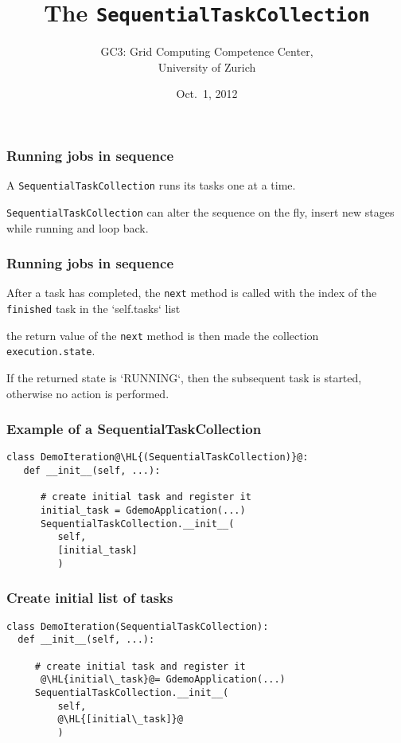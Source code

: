 \documentclass[english,serif,mathserif,xcolor=pdftex,dvipsnames,table]{beamer}
\title{%
  The \texttt{SequentialTaskCollection}
}
\author[Sergio Maffioletti]{%
  GC3: Grid Computing Competence Center, \\
  University of Zurich
}
\date{Oct.~1, 2012}
\begin{document}
\maketitle

\begin{frame}
  \frametitle{Running jobs in sequence}
  \begin{block}{}
    A \texttt{SequentialTaskCollection} runs its tasks one at a time.
  \end{block}
  \begin{block}{}
    \texttt{SequentialTaskCollection} can alter the sequence
    on the fly, insert new stages while running and loop
    back.
  \end{block}
\end{frame}

\begin{frame}
  \frametitle{Running jobs in sequence}
  \begin{block}{}
    After a task has completed, the \texttt{next} method is called with the
    index of the \texttt{finished} task in the `self.tasks` list
  \end{block}
  \begin{block}{}
    the return value of the \texttt{next} method is then made the collection
    \texttt{execution.state}.  
  \end{block}

  \begin{block}{}
    If the returned state is `RUNNING`, then the
    subsequent task is started, otherwise no action is performed.
  \end{block}
\end{frame}

\begin{frame}[fragile]
\frametitle{Example of a SequentialTaskCollection}
\begin{lstlisting}
class DemoIteration@\HL{(SequentialTaskCollection)}@:
   def __init__(self, ...):
        
      # create initial task and register it
      initial_task = GdemoApplication(...)
      SequentialTaskCollection.__init__(
         self, 
         [initial_task]
         ) 
      \end{lstlisting}
\end{frame}

\begin{frame}[fragile]
\frametitle{Create initial list of tasks}
  \begin{lstlisting}
class DemoIteration(SequentialTaskCollection):
  def __init__(self, ...):

     # create initial task and register it
      @\HL{initial\_task}@= GdemoApplication(...)
     SequentialTaskCollection.__init__(
         self, 
         @\HL{[initial\_task]}@ 
         )
  \end{lstlisting}
\end{frame}
\end{document}
